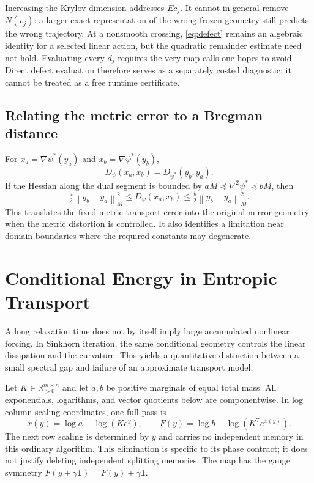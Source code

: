 \documentclass[journal]{IEEEtran}
\theoremstyle{definition}
\newcommand{\R}{\mathbb{R}}
\newcommand{\norm}[1]{\left\lVert#1\right\rVert}
\begin{document}
Increasing the Krylov dimension addresses $Ec_j$. It cannot in general
remove $N(v_j)$: a larger exact representation of the wrong frozen geometry
still predicts the wrong trajectory. At a nonsmooth crossing,
\eqref{eq:defect} remains an algebraic identity for a selected linear action,
but the quadratic remainder estimate need not hold. Evaluating every $d_j$
requires the very map calls one hopes to avoid. Direct defect evaluation
therefore serves as a separately costed diagnostic; it cannot be treated
as a free runtime certificate.

\subsection{Relating the metric error to a Bregman distance}
For $x_a=\nabla\psi^*(y_a)$ and $x_b=\nabla\psi^*(y_b)$,
\[
 D_\psi(x_a,x_b)=D_{\psi^*}(y_b,y_a).
\]
If the Hessian along the dual segment is bounded by
$aM\preceq\nabla^2\psi^*\preceq bM$, then
\begin{equation}
 \tfrac a2\norm{y_b-y_a}_M^2
 \leq D_\psi(x_a,x_b)
 \leq\tfrac b2\norm{y_b-y_a}_M^2.
\end{equation}
This translates the fixed-metric transport error into the original mirror
geometry when the metric distortion is controlled. It also identifies a
limitation near domain boundaries where the required constants may degenerate.


\section{Conditional Energy in Entropic Transport}
\label{sec:entropic-evolution}
A long relaxation time does not by itself imply large accumulated nonlinear
forcing. In Sinkhorn iteration, the same conditional geometry controls the
linear dissipation and the curvature. This yields a quantitative distinction
between a small spectral gap and failure of an approximate transport model.

Let $K\in\R_{>0}^{m\times n}$ and let $a,b$ be positive marginals of equal
total mass. All exponentials, logarithms, and vector quotients below are
componentwise. In log column-scaling coordinates, one full pass is
\begin{equation}
 x(y)=\log a-\log(Ke^y),\qquad
 F(y)=\log b-\log(K^Te^{x(y)}).
 \label{eq:entropic-map}
\end{equation}
The next row scaling is determined by $y$ and carries no independent memory
in this ordinary algorithm. This elimination is specific to its phase
contract; it does not justify deleting independent splitting memories.
The map has the gauge symmetry $F(y+\gamma\mathbf1)=F(y)+\gamma\mathbf1$.
\end{document}
